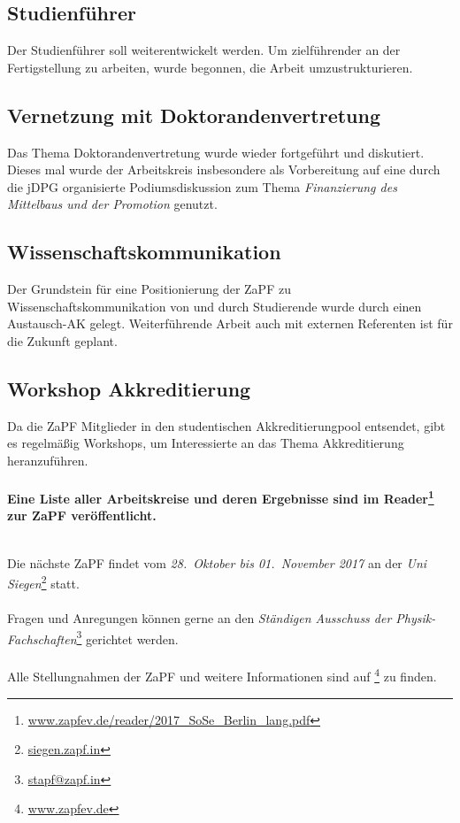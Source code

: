 \documentclass[a4paper]{article}
\begin{document}
\subsection*{Studienführer}
Der Studienführer soll weiterentwickelt werden. Um zielführender an der
Fertigstellung zu arbeiten, wurde begonnen, die Arbeit umzustrukturieren.

\subsection*{Vernetzung mit Doktorandenvertretung}
Das Thema Doktorandenvertretung wurde wieder fortgeführt und diskutiert. Dieses
mal wurde der Arbeitskreis insbesondere als Vorbereitung auf eine durch die
jDPG organisierte Podiumsdiskussion zum Thema \emph{Finanzierung des Mittelbaus
und der Promotion} genutzt.

\subsection*{Wissenschaftskommunikation}
Der Grundstein für eine Positionierung der ZaPF zu Wissenschaftskommunikation
von und durch Studierende wurde durch einen Austausch-AK gelegt. Weiterführende
Arbeit auch mit externen Referenten ist für die Zukunft geplant.

\subsection*{Workshop Akkreditierung}
Da die ZaPF Mitglieder in den studentischen Akkreditierungpool entsendet, gibt
es regelmäßig Workshops, um Interessierte an das Thema Akkreditierung
heranzuführen.\\
\\
\textbf{
Eine Liste aller Arbeitskreise und deren Ergebnisse sind im
Reader\footnote{\href{http://www.zapfev.de/reader/2017_SoSe_Berlin_lang.pdf}{\url{www.zapfev.de/reader/2017_SoSe_Berlin_lang.pdf}}}
zur ZaPF veröffentlicht.}

\vfill
~\\       
Die nächste ZaPF findet vom \emph{28.\ Oktober bis 01.\ November 2017} an der
\emph{Uni
Siegen}\footnote{\href{https://siegen.zapf.in/}{\url{siegen.zapf.in}}} statt.
\\
\\
Fragen und Anregungen können gerne an den \emph{Ständigen Ausschuss der
Physik-Fachschaften}\footnote{\href{mailto:stapf@zapf.in}{\url{stapf@zapf.in}}}
gerichtet werden.
\\
\\
Alle Stellungnahmen der ZaPF und weitere Informationen sind auf
\footnote{\href{http://www.zapfev.de}{\url{www.zapfev.de}}} zu finden.
\end{document}
